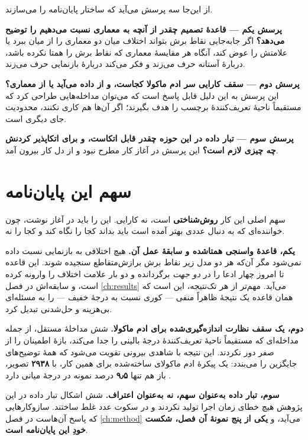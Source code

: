از این‌جا سه پرسش می‌آید که ساختار پایان‌نامه را می‌سازند.

\textbf{پرسش یکم — قاعدهٔ تصمیم چقدر از آنچه به معماری نسبت می‌دهیم را توضیح می‌دهد؟} اگر
جابه‌جایی نقاط برش بتواند اختلاف میان دو معماری را از میان ببرد یا علامتش را عوض کند، آنگاه
هر مقایسهٔ معماری که نقاط برش را همتا نکرده باشد، دربارهٔ آستانه حرف می‌زند و فکر می‌کند
دربارهٔ بازنمایی حرف می‌زند.

\textbf{پرسش دوم — سقف کارایی سر ادم ماکولا کجاست، و از داده می‌آید یا از معماری؟} این پرسش
به این دلیل قابل پاسخ است که می‌توان مداخله‌هایی طراحی کرد که مستقیماً ناحیهٔ تعریف‌کنندهٔ
برچسب را هدف بگیرند؛ اگر آن‌ها هم کاری نکنند، محدودیت جای دیگری است.

\textbf{پرسش سوم — تبار داده در این حوزه چقدر قابل اتکاست، و برای اتکاپذیر کردنش چه چیزی
لازم است؟} این پرسش در آغاز کار مطرح نبود و از دل کار بیرون آمد.

\section{سهم این پایان‌نامه}

سهم اصلی این کار \textbf{روش‌شناختی} است، نه کارایی. این را باید در آغاز نوشت، چون خواننده‌ای
که به دنبال عددی بهتر آمده است باید بداند کجا را نگاه کند و کجا را نه.

\textbf{یکم، قاعدهٔ واسنجی همتاشده و سابقهٔ عمل آن.} هیچ اختلافی به بازنمایی نسبت داده نمی‌شود
مگر آن‌که هر دو مدل زیر نقاط برش برازش‌متقاطع سنجیده شوند. این قاعده تا امروز چهار ادعا را در
\emph{دو جهت} برگردانده و دو بار علامت اختلاف را وارونه کرده است، و سابقه‌اش در فصل
\ref{ch:results} می‌آید. مهم‌تر از هر تک‌نتیجه، این است که همان قاعده یک نتیجهٔ ظاهراً منفی —
کوری نسبت به درجهٔ خفیف — را به مسئله‌ای بی‌هزینه و حل‌شدنی تبدیل کرد.

\textbf{دوم، یک سقف نظارت اندازه‌گیری‌شده برای ادم ماکولا.} شش مداخلهٔ مستقل، از جمله
مداخله‌ای که مستقیماً ناحیهٔ تعریف‌کنندهٔ درجهٔ بالینی را جدا می‌کند، بازهٔ اطمینان را از صفر
دور نکردند. این نتیجه با شاهدی بیرونی تقویت می‌شود که همهٔ توضیح‌های جایگزین را می‌بندد: یک
پیکرهٔ ادم ماکولای ساخته‌شده برای همین کار، با \textbf{\num{۲۹۳۸}} تصویر، باز هم تنها
\textbf{\num{۹٫۵}} درصد نمونه در درجهٔ میانی دارد \cite{tang2026mmrdr}.

\textbf{سوم، تبار داده به‌عنوان سهم، نه به‌عنوان اعتراف.} شش اشکال تبار داده در این پژوهش هیچ
خطای زمان اجرا تولید نکردند و در سکوت عدد غلط ساختند. سازوکارهایی که پاسخ آن‌هاست در فصل
\ref{ch:method} می‌آید، و \textbf{یکی از پنج نمونهٔ آن فصل، شکست خودِ این پایان‌نامه است}.

